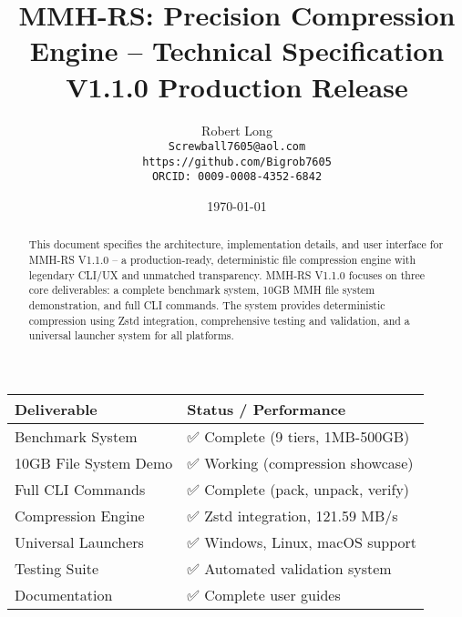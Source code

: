 \documentclass[11pt,a4paper]{article}
\title{MMH-RS: Precision Compression Engine -- Technical Specification\\[1ex]\textbf{\large V1.1.0 Production Release}}
\author{Robert Long \\ \texttt{Screwball7605@aol.com} \\ \texttt{https://github.com/Bigrob7605} \\ \texttt{ORCID: 0009-0008-4352-6842}}
\date{\today}
\begin{document}
	\maketitle
	\thispagestyle{empty}
	\begin{abstract}
		This document specifies the architecture, implementation details, and user interface for MMH-RS V1.1.0 -- a production-ready, deterministic file compression engine with legendary CLI/UX and unmatched transparency. MMH-RS V1.1.0 focuses on three core deliverables: a complete benchmark system, 10GB MMH file system demonstration, and full CLI commands. The system provides deterministic compression using Zstd integration, comprehensive testing and validation, and a universal launcher system for all platforms.
	\end{abstract}

	\begin{center}
	\begin{tcolorbox}[colback=gray!5, colframe=gray!60, boxrule=0.7pt, arc=2pt, title=\textbf{\large MMH-RS V1.1.0 Core Deliverables}]
	\begin{tabular}{@{}ll@{}}
	\toprule
	\textbf{Deliverable} & \textbf{Status / Performance} \\
	\midrule
	Benchmark System     & ✅ Complete (9 tiers, 1MB-500GB) \\
	10GB File System Demo & ✅ Working (compression showcase) \\
	Full CLI Commands    & ✅ Complete (pack, unpack, verify) \\
	Compression Engine   & ✅ Zstd integration, 121.59 MB/s \\
	Universal Launchers  & ✅ Windows, Linux, macOS support \\
	Testing Suite        & ✅ Automated validation system \\
	Documentation        & ✅ Complete user guides \\
	\bottomrule
	\end{tabular}
	\end{tcolorbox}
	\end{center}
\end{document}

